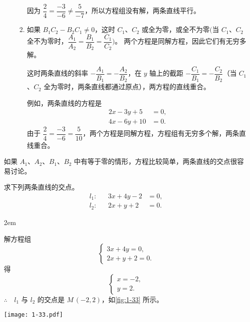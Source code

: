 \begin{enumerate}
\begin{enumerate}
    因为 $\dfrac{2}{4} = \dfrac{-3}{-6} \neq \dfrac{5}{-7}$，所以方程组没有解，两条直线平行。
    \item 如果 $B_1C_2-B_2C_1\neq 0$，这时 $C_1$、$C_2$ 或全为零，或全不为零$\biggl($当 $C_1$、$C_2$ 全不为零时，$\dfrac{A_1}{A_2}= \dfrac{B_1}{B_2}=\dfrac{C_1}{C_2}\biggr)$。
    两个方程是同解方程，因此它们有无穷多解。

    \medskip 这时两条直线的斜率 $-\dfrac{A_1}{B_1}=-\dfrac{A_2}{B_2}$，在 $y$ 轴上的截距 $-\dfrac{C_1}{B_1}=-\dfrac{C_2}{B_2}$（当 $C_1$、$C_2$ 全为零时，两条直线都通过原点），两方程的直线重合。

例如，两条直线的方程是
\begin{align*}
  2x-3y+5 & = 0,\\
  4x-6y+10 & = 0.
\end{align*}
由于 $\dfrac{2}{4} = \dfrac{-3}{-6} = \dfrac{5}{10}$，两个方程是同解方程，方程组有无穷多个解，两条直线重合。
  \end{enumerate}
\end{enumerate}

\bigskip 如果 $A_1$、$A_2$、$B_1$、$B_2$ 中有等于零的情形，方程比较简单，两条直线的交点很容易讨论。
\begin{example}
  求下列两条直线的交点。
  \begin{align*}
    l_1:&&3x+4y-2 & = 0,\\
    l_2:&&2x+y+2 & = 0.
  \end{align*}
\end{example}
\noindent
\begin{minipage}{0.6\linewidth}\parindent2em
\begin{solution}
  解方程组
  \[\begin{cases} 3x+4y=0,\\2x+y+2=0. \end{cases}\]
  得
  \[\begin{cases} x=-2,\\y=2. \end{cases}\]
  $\therefore \quad l_1$ 与 $l_2$ 的交点是 $M\,(-2,2)$，如\cref{fig:1-33} 所示。
\end{solution}
\end{minipage}\hfill
\begin{minipage}{0.35\linewidth}\centering
\begin{figurehere}
  \texttt{[image: 1-33.pdf]}
  \caption{}\label{fig:1-33}
\end{figurehere}
\end{minipage}

